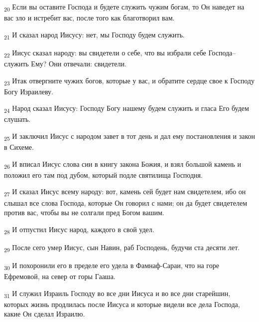 \begin{tcolorbox}
\textsubscript{20} Если вы оставите Господа и будете служить чужим богам, то Он наведет на вас зло и истребит вас, после того как благотворил вам.
\end{tcolorbox}
\begin{tcolorbox}
\textsubscript{21} И сказал народ Иисусу: нет, мы Господу будем служить.
\end{tcolorbox}
\begin{tcolorbox}
\textsubscript{22} Иисус сказал народу: вы свидетели о себе, что вы избрали себе Господа--служить Ему? Они отвечали: свидетели.
\end{tcolorbox}
\begin{tcolorbox}
\textsubscript{23} Итак отвергните чужих богов, которые у вас, и обратите сердце свое к Господу Богу Израилеву.
\end{tcolorbox}
\begin{tcolorbox}
\textsubscript{24} Народ сказал Иисусу: Господу Богу нашему будем служить и гласа Его будем слушать.
\end{tcolorbox}
\begin{tcolorbox}
\textsubscript{25} И заключил Иисус с народом завет в тот день и дал ему постановления и закон в Сихеме.
\end{tcolorbox}
\begin{tcolorbox}
\textsubscript{26} И вписал Иисус слова сии в книгу закона Божия, и взял большой камень и положил его там под дубом, который подле святилища Господня.
\end{tcolorbox}
\begin{tcolorbox}
\textsubscript{27} И сказал Иисус всему народу: вот, камень сей будет нам свидетелем, ибо он слышал все слова Господа, которые Он говорил с нами; он да будет свидетелем против вас, чтобы вы не солгали пред Богом вашим.
\end{tcolorbox}
\begin{tcolorbox}
\textsubscript{28} И отпустил Иисус народ, каждого в свой удел.
\end{tcolorbox}
\begin{tcolorbox}
\textsubscript{29} После сего умер Иисус, сын Навин, раб Господень, будучи ста десяти лет.
\end{tcolorbox}
\begin{tcolorbox}
\textsubscript{30} И похоронили его в пределе его удела в Фамнаф-Сараи, что на горе Ефремовой, на север от горы Гааша.
\end{tcolorbox}
\begin{tcolorbox}
\textsubscript{31} И служил Израиль Господу во все дни Иисуса и во все дни старейшин, которых жизнь продлилась после Иисуса и которые видели все дела Господа, какие Он сделал Израилю.
\end{tcolorbox}
